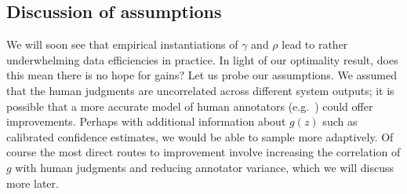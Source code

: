 \subsection{Discussion of assumptions}
We will soon see that empirical instantiations of $\gamma$ and $\rho$ lead to rather underwhelming data efficiencies in practice.
In light of our optimality result, does this mean there is no hope for gains?
Let us probe our assumptions.
We assumed that the human judgments are uncorrelated across different system outputs;
it is possible that a more accurate model of human annotators (e.g.\ \citet{passonneau2014benefits}) could offer improvements.
Perhaps with additional information about $g(z)$ such as calibrated confidence estimates,
we would be able to sample more adaptively.
Of course the most direct routes to improvement involve increasing the correlation of $g$ with human judgments and reducing annotator variance,
which we will discuss more later.


